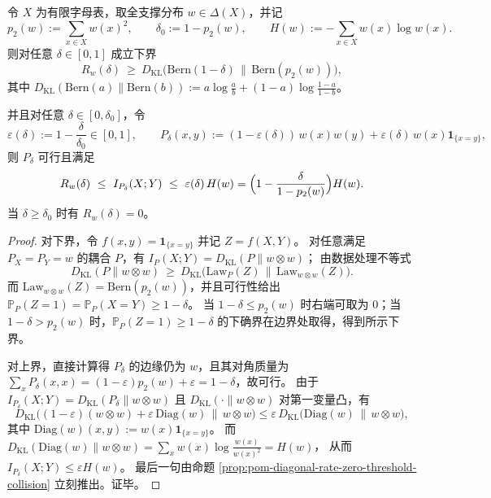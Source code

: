\begin{theorem}[对角粗粒化下界与线性可达上界]\label{thm:pom-diagonal-rate-bernoulli-lower-and-mixture-upper}
令 \(X\) 为有限字母表，取全支撑分布 \(w\in\Delta(X)\)，并记
\[
p_2(w):=\sum_{x\in X}w(x)^2,\qquad \delta_0:=1-p_2(w),\qquad H(w):=-\sum_{x\in X}w(x)\log w(x).
\]
则对任意 \(\delta\in[0,1]\) 成立下界
\[
R_w(\delta)\ \ge\ D_{\mathrm{KL}}\!\bigl(\mathrm{Bern}(1-\delta)\,\|\,\mathrm{Bern}(p_2(w))\bigr),
\]
其中 \(D_{\mathrm{KL}}(\mathrm{Bern}(a)\|\mathrm{Bern}(b)):=a\log\frac{a}{b}+(1-a)\log\frac{1-a}{1-b}\)。
\par
并且对任意 \(\delta\in[0,\delta_0]\)，令
\[
\varepsilon(\delta):=1-\frac{\delta}{\delta_0}\in[0,1],\qquad
P_\delta(x,y):=(1-\varepsilon(\delta))\,w(x)w(y)+\varepsilon(\delta)\,w(x)\mathbf 1_{\{x=y\}},
\]
则 \(P_\delta\) 可行且满足
\[
R_w(\delta)\ \le\ I_{P_\delta}(X;Y)\ \le\ \varepsilon(\delta)\,H(w)
=\Bigl(1-\frac{\delta}{1-p_2(w)}\Bigr)H(w).
\]
当 \(\delta\ge\delta_0\) 时有 \(R_w(\delta)=0\)。
\end{theorem}
\begin{proof}
对下界，令 \(f(x,y)=\mathbf 1_{\{x=y\}}\) 并记 \(Z=f(X,Y)\)。
对任意满足 \(P_X=P_Y=w\) 的耦合 \(P\)，有
\(
I_P(X;Y)=D_{\mathrm{KL}}(P\|w\otimes w)
\)；
由数据处理不等式
\[
D_{\mathrm{KL}}(P\|w\otimes w)\ \ge\ D_{\mathrm{KL}}\!\bigl(\mathrm{Law}_P(Z)\,\|\,\mathrm{Law}_{w\otimes w}(Z)\bigr).
\]
而 \(\mathrm{Law}_{w\otimes w}(Z)=\mathrm{Bern}(p_2(w))\)，并且可行性给出 \(\mathbb P_P(Z=1)=\mathbb P_P(X=Y)\ge 1-\delta\)。
当 \(1-\delta\le p_2(w)\) 时右端可取为 \(0\)；当 \(1-\delta>p_2(w)\) 时，\(\mathbb P_P(Z=1)\ge 1-\delta\) 的下确界在边界处取得，得到所示下界。
\par
对上界，直接计算得 \(P_\delta\) 的边缘仍为 \(w\)，且其对角质量为
\(
\sum_x P_\delta(x,x)=(1-\varepsilon)p_2(w)+\varepsilon=1-\delta
\)，故可行。
由于
\(
I_{P_\delta}(X;Y)=D_{\mathrm{KL}}(P_\delta\|w\otimes w)
\)
且 \(D_{\mathrm{KL}}(\cdot\|w\otimes w)\) 对第一变量凸，有
\[
D_{\mathrm{KL}}\!\bigl((1-\varepsilon)(w\otimes w)+\varepsilon\,\mathrm{Diag}(w)\,\big\|\,w\otimes w\bigr)
\le \varepsilon\,D_{\mathrm{KL}}\!\bigl(\mathrm{Diag}(w)\,\|\,w\otimes w\bigr),
\]
其中 \(\mathrm{Diag}(w)(x,y):=w(x)\mathbf 1_{\{x=y\}}\)。
而
\(
D_{\mathrm{KL}}(\mathrm{Diag}(w)\|w\otimes w)=\sum_x w(x)\log\frac{w(x)}{w(x)^2}=H(w)
\)，
从而 \(I_{P_\delta}(X;Y)\le \varepsilon H(w)\)。
最后一句由命题 \ref{prop:pom-diagonal-rate-zero-threshold-collision} 立刻推出。证毕。
\end{proof}

